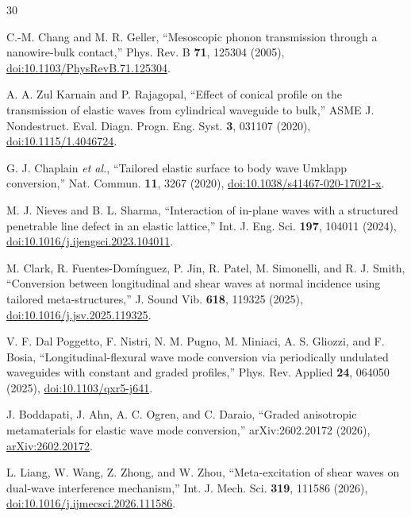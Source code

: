 \documentclass[10pt,aps,pre,reprint,floatfix,notitlepage,nofootinbib]{revtex4-2}
\begin{document}
\begin{thebibliography}{30}
\scriptsize
\setlength{\itemsep}{0pt}
\setlength{\parskip}{0pt}

C.-M. Chang and M. R. Geller,
``Mesoscopic phonon transmission through a nanowire-bulk contact,''
Phys. Rev. B \textbf{71}, 125304 (2005),
\href{https://doi.org/10.1103/PhysRevB.71.125304}{doi:10.1103/PhysRevB.71.125304}.

A. A. Zul Karnain and P. Rajagopal,
``Effect of conical profile on the transmission of elastic waves from cylindrical waveguide to bulk,''
ASME J. Nondestruct. Eval. Diagn. Progn. Eng. Syst. \textbf{3}, 031107 (2020),
\href{https://doi.org/10.1115/1.4046724}{doi:10.1115/1.4046724}.

G. J. Chaplain \textit{et al.},
``Tailored elastic surface to body wave Umklapp conversion,''
Nat. Commun. \textbf{11}, 3267 (2020),
\href{https://doi.org/10.1038/s41467-020-17021-x}{doi:10.1038/s41467-020-17021-x}.

M. J. Nieves and B. L. Sharma,
``Interaction of in-plane waves with a structured penetrable line defect in an elastic lattice,''
Int. J. Eng. Sci. \textbf{197}, 104011 (2024),
\href{https://doi.org/10.1016/j.ijengsci.2023.104011}{doi:10.1016/j.ijengsci.2023.104011}.

M. Clark, R. Fuentes-Dom\'inguez, P. Jin, R. Patel, M. Simonelli, and R. J. Smith,
``Conversion between longitudinal and shear waves at normal incidence using tailored meta-structures,''
J. Sound Vib. \textbf{618}, 119325 (2025),
\href{https://doi.org/10.1016/j.jsv.2025.119325}{doi:10.1016/j.jsv.2025.119325}.

V. F. Dal Poggetto, F. Nistri, N. M. Pugno, M. Miniaci, A. S. Gliozzi, and F. Bosia,
``Longitudinal-flexural wave mode conversion via periodically undulated waveguides with constant and graded profiles,''
Phys. Rev. Applied \textbf{24}, 064050 (2025),
\href{https://doi.org/10.1103/qxr5-j641}{doi:10.1103/qxr5-j641}.

J. Boddapati, J. Ahn, A. C. Ogren, and C. Daraio,
``Graded anisotropic metamaterials for elastic wave mode conversion,''
arXiv:2602.20172 (2026),
\href{https://arxiv.org/abs/2602.20172}{arXiv:2602.20172}.

L. Liang, W. Wang, Z. Zhong, and W. Zhou,
``Meta-excitation of shear waves on dual-wave interference mechanism,''
Int. J. Mech. Sci. \textbf{319}, 111586 (2026),
\href{https://doi.org/10.1016/j.ijmecsci.2026.111586}{doi:10.1016/j.ijmecsci.2026.111586}.


\end{thebibliography}
\end{document}
